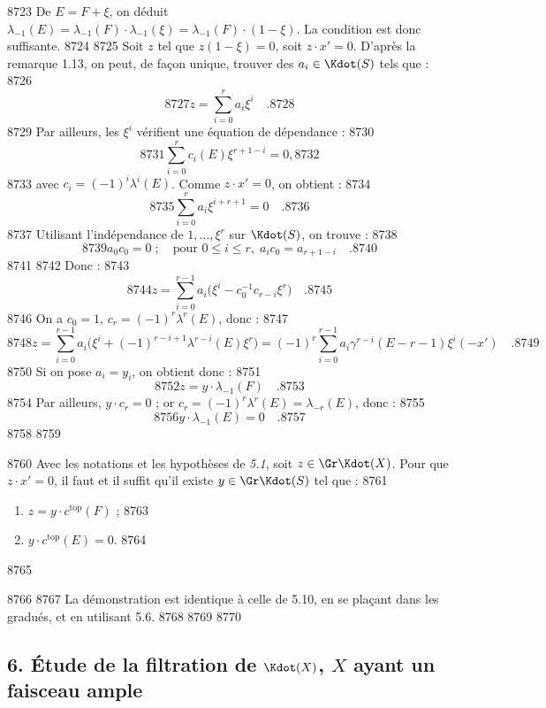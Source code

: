   8723	De $E = F + \xi$, on d\'eduit $\lambda_{-1}(E) = \lambda_{-1}(F) \cdot \lambda_{-1}(\xi) = \lambda_{-1}(F) \cdot (1 - \xi)$. La condition est donc suffisante.
  8724	
  8725	Soit $z$ tel que $z(1 - \xi) = 0$, soit $z \cdot x' = 0$. D'apr\`es la remarque 1.13, on peut, de fa\c{c}on unique, trouver des $a_i \in \Kdot(S)$ tels que :
  8726	\[
  8727	z = \sum_{i=0}^{r} a_i \xi^i \quad .
  8728	\]
  8729	Par ailleurs, les $\xi^i$ v\'erifient une \'equation de d\'ependance :
  8730	\[
  8731	\sum_{i=0}^{r} c_i(E) \xi^{r+1-i} = 0,
  8732	\]
  8733	avec $c_i = (-1)^i \lambda^i(E)$. Comme $z \cdot x' = 0$, on obtient :
  8734	\[
  8735	\sum_{i=0}^{r} a_i \xi^{i+r+1} = 0 \quad .
  8736	\]
  8737	Utilisant l'ind\'ependance de $1,\dots,\xi^r$ sur $\Kdot(S)$, on trouve :
  8738	\[
  8739	a_0 c_0 = 0 \; ; \quad \text{pour } 0 \leq i \leq r, \; a_i c_0 = a_{r+1-i} \quad .
  8740	\]
  8741	
  8742	Donc :
  8743	\[
  8744	z = \sum_{i=0}^{r-1} a_i \bigl(\xi^i - c_0^{-1} c_{r-i} \xi^r\bigr) \quad .
  8745	\]
  8746	On a $c_0 = 1$, $c_r = (-1)^r \lambda^r(E)$, donc :
  8747	\[
  8748	z = \sum_{i=0}^{r-1} a_i \bigl(\xi^i + (-1)^{r-i+1} \lambda^{r-i}(E) \xi^r\bigr) = (-1)^r \sum_{i=0}^{r-1} a_i \gamma^{r-i}(E - r - 1) \xi^i (-x') \quad .
  8749	\]
  8750	Si on pose $a_i = y_i$, on obtient donc :
  8751	\[
  8752	z = y \cdot \lambda_{-1}(F) \quad .
  8753	\]
  8754	Par ailleurs, $y \cdot c_r = 0$ ; or $c_r = (-1)^r \lambda^r(E) = \lambda_{-r}(E)$, donc :
  8755	\[
  8756	y \cdot \lambda_{-1}(E) = 0 \quad .
  8757	\]
  8758	
  8759	\begin{proposition}[5.11]
  8760	Avec les notations et les hypoth\`eses de \emph{5.1}, soit $z \in \Gr \Kdot(X)$. Pour que $z \cdot x' = 0$, il faut et il suffit qu'il existe $y \in \Gr \Kdot(S)$ tel que :
  8761	\begin{enumerate}[label=\roman*)]
  8762	\item $z = y \cdot c^{\text{top}}(F)$ ;
  8763	\item $y \cdot c^{\text{top}}(E) = 0$.
  8764	\end{enumerate}
  8765	\end{proposition}
  8766	
  8767	La d\'emonstration est identique \`a celle de 5.10, en se pla\c{c}ant dans les gradu\'es, et en utilisant 5.6.
  8768	
  8769	%
  8770	\subsection*{6. \'Etude de la filtration de $\Kdot(X)$, $X$ ayant un faisceau ample}
